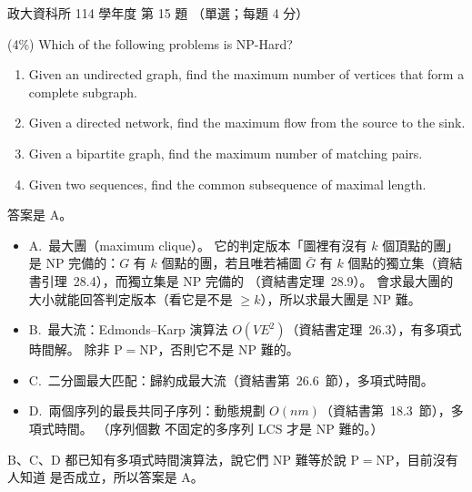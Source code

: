 \begin{pastexam}[label={px:nccu-114-dsa-15}]{政大資科所 114 學年度 第 15 題}
（單選；每題 4 分）

(4\%) Which of the following problems is NP-Hard?
\begin{enumerate}[label=\Alph*.]
\item Given an undirected graph, find the maximum number of vertices that form a complete subgraph.
\item Given a directed network, find the maximum flow from the source to the sink.
\item Given a bipartite graph, find the maximum number of matching pairs.
\item Given two sequences, find the common subsequence of maximal length.
\end{enumerate}
\end{pastexam}

\begin{pastsoln}
答案是 A。

\begin{itemize}
\item A.~最大團（maximum clique）。 它的判定版本「圖裡有沒有 $k$ 個頂點的團」是 NP 完備的：$G$ 有
$k$ 個點的團，若且唯若補圖 $\bar G$ 有 $k$ 個點的獨立集（資結書引理~28.4），而獨立集是 NP 完備的
（資結書定理~28.9）。 會求最大團的大小就能回答判定版本（看它是不是 $\ge k$），所以求最大團是 NP 難。
\item B.~最大流：Edmonds--Karp 演算法 $O(VE^2)$（資結書定理~26.3），有多項式時間解。 除非
$\mathrm{P} = \mathrm{NP}$，否則它不是 NP 難的。
\item C.~二分圖最大匹配：歸約成最大流（資結書第~26.6~節），多項式時間。
\item D.~兩個序列的最長共同子序列：動態規劃 $O(nm)$（資結書第~18.3~節），多項式時間。 （序列個數
不固定的多序列 LCS 才是 NP 難的。）
\end{itemize}
B、C、D 都已知有多項式時間演算法，說它們 NP 難等於說 $\mathrm{P} = \mathrm{NP}$，目前沒有人知道
是否成立，所以答案是 A。
\end{pastsoln}
